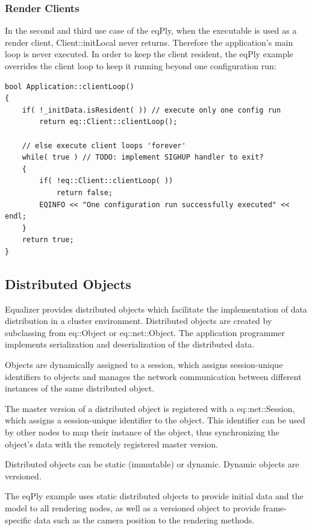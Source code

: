 \documentclass[10pt,a4]{scrartcl}
\begin{document}
\subsubsection{Render Clients}

In the second and third use case of the \textsf{eqPly}, when the
executable is used as a render client, \textsf{Client::initLocal} never
returns. Therefore the application's main loop is never executed. In
order to keep the client resident, the \textsf{eqPly} example overrides
the client loop to keep it running beyond one configuration run:

{\footnotesize\begin{lstlisting}
bool Application::clientLoop()
{
    if( !_initData.isResident( )) // execute only one config run
        return eq::Client::clientLoop();

    // else execute client loops 'forever'
    while( true ) // TODO: implement SIGHUP handler to exit?
    {
        if( !eq::Client::clientLoop( ))
            return false;
        EQINFO << "One configuration run successfully executed" << endl;
    }
    return true;
}
\end{lstlisting}}%


\subsection{\label{sNetObject}Distributed Objects}

Equalizer provides distributed objects which facilitate the
implementation of data distribution in a cluster
environment. Distributed objects are created by subclassing from
\textsf{eq::Object} or \textsf{eq::net::Object}. The application
programmer implements serialization and deserialization of the
distributed data.

Objects are dynamically assigned to a session, which assigns
session-unique identifiers to objects and manages the network
communication between different instances of the same distributed
object.

The master version of a distributed object is registered with a
\textsf{eq::net::Session}, which assigns a session-unique identifier to
the object. This identifier can be used by other nodes to map their
instance of the object, thus synchronizing the object's data with the
remotely registered master version.

Distributed objects can be static (immutable) or dynamic. Dynamic
objects are versioned.

The \textsf{eqPly} example uses static distributed objects to provide
initial data and the model to all rendering nodes, as well as a
versioned object to provide frame-specific data such as the camera
position to the rendering methods.
\end{document}
